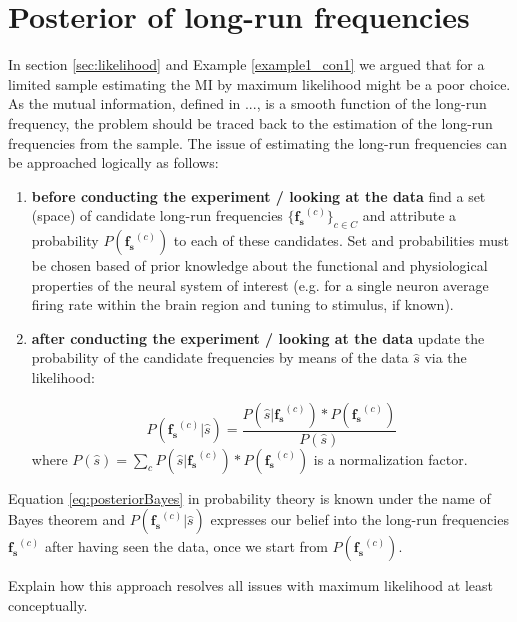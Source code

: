 \section{Posterior of long-run frequencies}\label{sec:pos_long-run}

In section \ref{sec:likelihood} and Example \ref{example1_con1} we argued that for a limited sample estimating the MI by maximum likelihood might be a poor choice. As the mutual information, defined in ..., is a smooth function of the long-run frequency, the problem should be traced back to the estimation of the long-run frequencies from the sample. The issue of estimating the long-run frequencies can be approached logically as follows: 

\begin{enumerate}

\item \textbf{before conducting the experiment / looking at the data} find a set (space) of candidate long-run frequencies $\{\mathbf{f_s}^{(c)}\}_{c \in C}$ and attribute a probability $P(\mathbf{f_s}^{(c)})$ to each of these candidates. Set and probabilities must be chosen based of prior knowledge about the functional and physiological properties of the neural system of interest (e.g. for a single neuron average firing rate within the brain region and tuning to stimulus, if known). 

\item \textbf{after conducting the experiment / looking at the data} update the probability of the candidate frequencies by means of the data $\hat{s}$ via the likelihood:

\begin{equation}
P(\mathbf{f_s}^{(c)}\vert\hat{s})=\frac{P(\hat{s}\vert \mathbf{f_s}^{(c)})*P(\mathbf{f_s}^{(c)})}{P(\hat{s})}
\label{eq:posteriorBayes}
\end{equation}
where $P(\hat{s})=\sum_c P(\hat{s}\vert \mathbf{f_s}^{(c)})*P(\mathbf{f_s}^{(c)})$ is a normalization factor.

\end{enumerate} 

Equation \eqref{eq:posteriorBayes} in probability theory is known under the name of Bayes theorem and $P(\mathbf{f_s}^{(c)}\vert\hat{s})$ expresses our belief into the long-run frequencies $\mathbf{f_s}^{(c)}$ after having seen the data, once we start from $P(\mathbf{f_s}^{(c)})$. 

Explain how this approach resolves all issues with maximum likelihood at least conceptually.